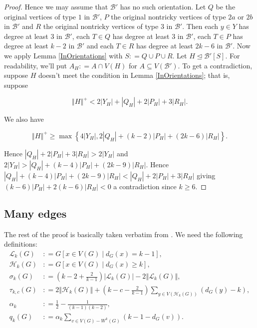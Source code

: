 \documentclass[12pt]{article}
\theoremstyle{plain}
\theoremstyle{definition}
\theoremstyle{remark}
\newcommand{\fancy}[1]{\mathcal{#1}}
\newcommand{\B}{\fancy{B}}
\renewcommand{\L}{\fancy{L}}
\newcommand{\HH}{\fancy{H}}
\newcommand{\set}[1]{\left\{ #1 \right\}}
\newcommand{\card}[1]{\left|#1\right|}
\newcommand{\size}[1]{\left\Vert#1\right\Vert}
\newcommand{\parens}[1]{\left( #1 \right)}
\newcommand{\brackets}[1]{\left[ #1 \right]}
\newcommand{\DefinedAs}{\mathrel{\mathop:}=}
\begin{document}
\begin{proof}
Hence we may assume that $\B'$ has no such orientation. Let $Q$ be the original vertices of type $1$ in $\B'$, $P$ the original nontricky vertices of type $2a$ or $2b$ in $\B'$ and $R$ the original nontricky vertices of type $3$ in $\B'$.  Then each $y \in Y$ has degree at least $3$ in $\B'$, each $T \in Q$ has degree at least $3$ in $\B'$, each $T \in P$ has degree at least $k-2$ in $\B'$ and each $T \in R$ has degree at least $2k-6$ in $\B'$.  Now we apply Lemma \ref{InOrientations} with $S \DefinedAs Q \cup P \cup R$.  Let $H \unlhd \B'[S]$.  For readability, we'll put $A_H \DefinedAs A \cap V(H)$ for $A \subseteq V(\B')$.  To get a contradiction, suppose $H$ doesn't meet the condition in Lemma \ref{InOrientations}; that is, suppose 

\[\size{H}^+ < 2\card{Y_H} + \card{Q_H} + 2\card{P_H} + 3\card{R_H}.\] 

\noindent We also have 

\[\size{H}^+ \geq \max\set{4\card{Y_H}, 2\card{Q_H} + (k-2)\card{P_H} + (2k-6)\card{R_H}}.\]

\noindent Hence $\card{Q_H} + 2\card{P_H} + 3\card{R_H} > 2\card{Y_H}$ and $2\card{Y_H} > \card{Q_H} + (k-4)\card{P_H} + (2k-9)\card{R_H}$.  Hence $\card{Q_H} + (k-4)\card{P_H} + (2k-9)\card{R_H} < \card{Q_H} + 2\card{P_H} + 3\card{R_H}$ giving $(k-6)\card{P_H} + 2(k-6)\card{R_H} < 0$ a contradiction since $k \geq 6$.
\end{proof}

\subsection{Many edges}\label{LowerBoundSectionEuler}
The rest of the proof is basically taken verbatim from \cite{kostochkastiebitzedgesincriticalgraph}. We need the following definitions:
\begin{align*}
\L_k(G) &\DefinedAs G\brackets{x \in V(G) \mid d_G(x) = k-1},\\
\HH_k(G) &\DefinedAs G\brackets{x \in V(G) \mid d_G(x) \geq k},\\
\sigma_k(G) &\DefinedAs \parens{k-2 + \frac{2}{k-1}}\card{\L_k(G)} - 2\size{\L_k(G)},\\
\tau_{k,c}(G) &\DefinedAs 2\size{\HH_k(G)} + \parens{k-c - \frac{2}{k-1}}\sum_{y \in V(\HH_k(G))} \parens{d_G(y) - k},\\
\alpha_k &\DefinedAs \frac12 - \frac{1}{(k-1)(k-2)},\\
q_k(G) &\DefinedAs \alpha_k\sum_{v \in V(G) - W^k(G)} \parens{k-1 - d_G(v)}.\\
\end{align*}
\end{document}
